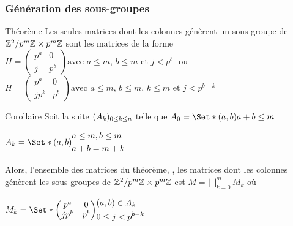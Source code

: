 \documentclass[10pt]{beamer}
\newcommand*{\pmZpmZ }{p^m\Z \x p^m\Z}
\newcommand*{\ZZpmZ}{\Z^2/\pmZpmZ}
\begin{document}
\begin{frame}
	\frametitle{Génération des sous-groupes}
	\begin{alertblock}{Théorème}
		Les seules matrices dont les colonnes génèrent un sous-groupe de $\ZZpmZ$
		sont les matrices de la forme
		$H =
			\begin{pmatrix}
				p^a & 0   \\
				j   & p^b
			\end{pmatrix}
			\text{avec $a \le m$, $b \le m$ et $j < p^b$}
		$
		$ \text{ ou }$
		$ H =\begin{pmatrix}
				p^a  & 0   \\
				jp^k & p^b
			\end{pmatrix}
			\text{avec $a \le m$, $b \le m$, $k \le m$ et $j < p^{b - k}$}
		$
	\end{alertblock}
	\begin{block}{Corollaire}
		Soit la suite $(A_{k})_{0 \le k \le n}$ telle que
		$A_0 = \Set*{(a,b)}{ a + b \le m}$\\
		\vspace*{-0.1cm}
		\begin{center}
			$A_k = \Set*{
					(a,b)}{
					\begin{aligned}
						 & a \le m, b \le m \\
						 & a + b = m + k
					\end{aligned}
				}$
		\end{center}

		Alors, l'ensemble des matrices du théorème, \cad, les matrices dont les colonnes
		génèrent les sous-groupes de $\ZZpmZ$ est
		$M = \bigsqcup_{k = 0}^mM_k$
		où \vspace*{-0.1cm}
		\begin{center}
			$
				M_k = \Set*{
					\begin{pmatrix}
						p^a  & 0   \\
						jp^k & p^b
					\end{pmatrix}
				}{
					\begin{aligned}
						 & (a, b) \in A_k      \\
						 & 0 \le j < p^{b - k}
					\end{aligned}
				}
			$
		\end{center}
	\end{block}

\end{frame}
\end{document}

